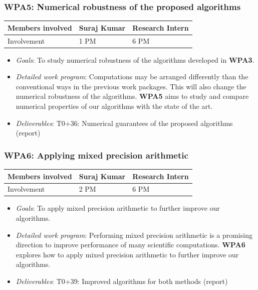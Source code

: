 \documentclass[a4paper,11pt]{article}
\newcommand{\subtask}[1]{{\color{orange}\paragraph{#1}$ $}}
\newcommand{\goal}{{\color{orange2}  \emph{Goals}:} }
\newcommand{\dwp}{{\color{orange2}  \emph{Detailed work program}: }}
\newcommand{\deliverables}{{\color{orange2}  \emph{Deliverables}: }}
\begin{document}
	\subsubsection{\textbf{WPA5}: Numerical robustness of the proposed algorithms}
	\vspace*{-0.385cm}\begin{table}[H]
		\begin{tabular}{lll}
			\hline
			\cellcolor{blue2}
			Members involved & Suraj Kumar& Research Intern \\
			\hline
			\cellcolor{orange2}
			Involvement      & 1 PM            & 6 PM \\
			\hline
		\end{tabular}
	\end{table}\vspace*{-0.25cm}
	\begin{itemize}[leftmargin=-1pt]
		\item[] \goal To study numerical robustness of the algorithms developed in \textbf{WPA3}.
		\item[] \dwp Computations may be arranged differently than the conventional ways in the previous work packages. This will also change the numerical robustness of the algorithms. \textbf{WPA5} aims to study and compare numerical properties of our algorithms with the state of the art. 
		\item[] \deliverables
		T0+36: Numerical guarantees of the proposed algorithms (report)
	\end{itemize}
	\subsubsection{\textbf{WPA6}: Applying mixed precision arithmetic}
	\vspace*{-0.385cm}\begin{table}[H]
		\begin{tabular}{lll}
			\hline
			\cellcolor{blue2}
			Members involved & Suraj Kumar& Research Intern \\
			\hline
			\cellcolor{orange2}
			Involvement      & 2 PM            & 6 PM \\
			\hline
		\end{tabular}
	\end{table}\vspace*{-0.25cm}
	\begin{itemize}[leftmargin=-1pt]
		\item[] \goal To apply mixed precision arithmetic to further improve our algorithms.
		\item[] \dwp Performing mixed precision arithmetic is a promising direction to improve performance of many scientific computations. \textbf{WPA6} explores how to apply mixed precision arithmetic to further improve our algorithms.
		\item[] \deliverables T0+39: Improved algorithms for both methods (report)
	\end{itemize}
	
\end{document}
